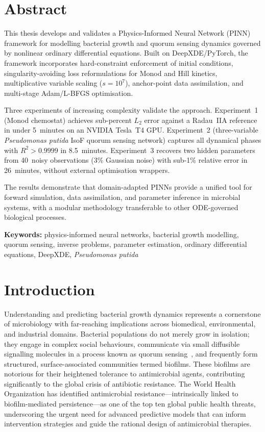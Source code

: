 \documentclass[14pt,a4paper,openany]{extbook}
\begin{document}


\chapter*{Abstract}

This thesis develops and validates a Physics-Informed Neural Network (PINN)
framework for modelling bacterial growth and quorum sensing dynamics
governed by nonlinear ordinary differential equations. Built on
DeepXDE/PyTorch, the framework incorporates hard-constraint enforcement of
initial conditions, singularity-avoiding loss reformulations for Monod and
Hill kinetics, multiplicative variable scaling ($s=10^{7}$), anchor-point
data assimilation, and multi-stage Adam/L-BFGS optimisation.

Three experiments of increasing complexity validate the approach.
Experiment~1 (Monod chemostat) achieves sub-percent $L_2$ error against a
Radau~IIA reference in under 5~minutes on an NVIDIA Tesla~T4 GPU.
Experiment~2 (three-variable \textit{Pseudomonas putida} IsoF quorum
sensing network) captures all dynamical phases with $R^2>0.9999$ in
8.5~minutes. Experiment~3 recovers two hidden parameters from 40~noisy
observations (3\% Gaussian noise) with sub-1\% relative error in
26~minutes, without external optimisation wrappers.

The results demonstrate that domain-adapted PINNs provide a unified tool
for forward simulation, data assimilation, and parameter inference in
microbial systems, with a modular methodology transferable to other
ODE-governed biological processes.

\bigskip
\noindent\textbf{Keywords:} physics-informed neural networks, bacterial
growth modelling, quorum sensing, inverse problems, parameter estimation,
ordinary differential equations, DeepXDE, \textit{Pseudomonas putida}

\newpage
\tableofcontents
\newpage
\listoffigures

\chapter{Introduction}
\label{chap:intro}

Understanding and predicting bacterial growth dynamics represents a cornerstone of microbiology with far-reaching implications across biomedical, environmental, and industrial domains. Bacterial populations do not merely grow in isolation; they engage in complex social behaviours, communicate via small diffusible signalling molecules in a process known as quorum sensing~\cite{mukherjee2019bacterial}, and frequently form structured, surface-associated communities termed biofilms. These biofilms are notorious for their heightened tolerance to antimicrobial agents, contributing significantly to the global crisis of antibiotic resistance. The World Health Organization has identified antimicrobial resistance---intrinsically linked to biofilm-mediated persistence---as one of the top ten global public health threats, underscoring the urgent need for advanced predictive models that can inform intervention strategies and guide the rational design of antimicrobial therapies.
\end{document}
